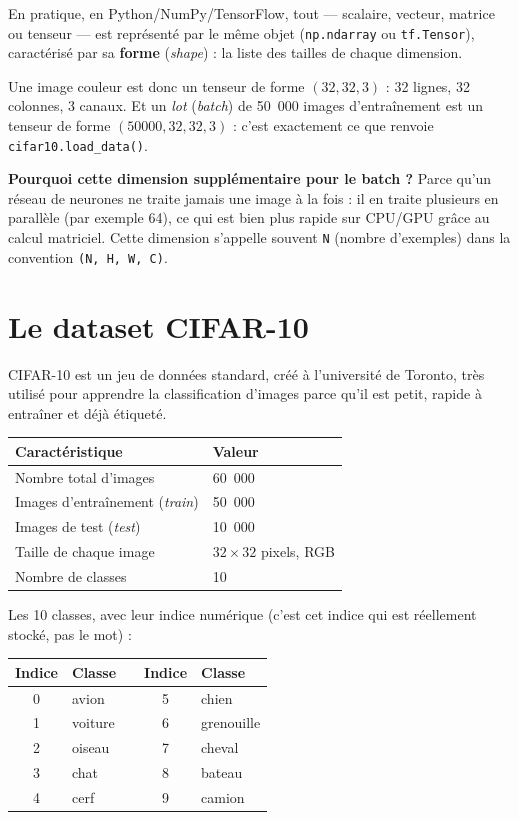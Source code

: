 \documentclass[11pt,a4paper]{article}
\begin{document}
En pratique, en Python/NumPy/TensorFlow, tout --- scalaire, vecteur,
matrice ou tenseur --- est repr\'esent\'e par le m\^eme objet
(\texttt{np.ndarray} ou \texttt{tf.Tensor}), caract\'eris\'e par sa
\textbf{forme} (\emph{shape}) : la liste des tailles de chaque dimension.

Une image couleur est donc un tenseur de forme $(32, 32, 3)$ : 32 lignes,
32 colonnes, 3 canaux. Et un \emph{lot} (\emph{batch}) de 50~000 images
d'entra\^inement est un tenseur de forme $(50000, 32, 32, 3)$ : c'est
exactement ce que renvoie \texttt{cifar10.load\_data()}.

\textbf{Pourquoi cette dimension suppl\'ementaire pour le batch ?} Parce
qu'un r\'eseau de neurones ne traite jamais une image \`a la fois : il
en traite plusieurs en parall\`ele (par exemple 64), ce qui est bien plus
rapide sur CPU/GPU gr\^ace au calcul matriciel. Cette dimension s'appelle
souvent \texttt{N} (nombre d'exemples) dans la convention
\texttt{(N, H, W, C)}.

\section{Le dataset CIFAR-10}

CIFAR-10 est un jeu de donn\'ees standard, cr\'e\'e \`a l'universit\'e de
Toronto, tr\`es utilis\'e pour apprendre la classification d'images
parce qu'il est petit, rapide \`a entra\^iner et d\'ej\`a \'etiquet\'e.

\begin{center}
\begin{tabular}{@{}ll@{}}
\toprule
Caract\'eristique & Valeur \\
\midrule
Nombre total d'images & 60~000 \\
Images d'entra\^inement (\emph{train}) & 50~000 \\
Images de test (\emph{test}) & 10~000 \\
Taille de chaque image & $32 \times 32$ pixels, RGB \\
Nombre de classes & 10 \\
\bottomrule
\end{tabular}
\end{center}

Les 10 classes, avec leur indice num\'erique (c'est cet indice qui est
r\'eellement stock\'e, pas le mot) :

\begin{center}
\begin{tabular}{@{}cl@{}c@{}cl@{}}
\toprule
Indice & Classe & \phantom{xx} & Indice & Classe \\
\midrule
0 & avion & & 5 & chien \\
1 & voiture & & 6 & grenouille \\
2 & oiseau & & 7 & cheval \\
3 & chat & & 8 & bateau \\
4 & cerf & & 9 & camion \\
\bottomrule
\end{tabular}
\end{center}
\end{document}
